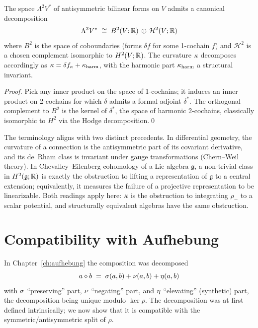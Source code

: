 \begin{theorem}\label{thm:splitting}
The space $\Lambda^2 V^*$ of antisymmetric bilinear forms on $V$ admits a
canonical decomposition
\[
\Lambda^2 V^* \;\cong\; B^2(V;\mathbb{R})\,\oplus\,\mathcal{H}^2(V;\mathbb{R})
\]
where $B^2$ is the space of coboundaries (forms $\delta f$ for some
1-cochain $f$) and $\mathcal{H}^2$ is a chosen complement isomorphic to
$H^2(V;\mathbb{R})$. The curvature $\kappa$ decomposes accordingly as
$\kappa=\delta f_\kappa+\kappa_{\mathrm{harm}}$, with the harmonic part
$\kappa_{\mathrm{harm}}$ a structural invariant.
\end{theorem}
\begin{proof}
Pick any inner product on the space of 1-cochains; it induces an inner
product on 2-cochains for which $\delta$ admits a formal adjoint
$\delta^*$. The orthogonal complement to $B^2$ is the kernel of
$\delta^*$, the space of harmonic 2-cochains, classically isomorphic to
$H^2$ via the Hodge decomposition.\qed
\end{proof}

\begin{remark}
The terminology aligns with two distinct precedents. In differential
geometry, the curvature of a connection is the antisymmetric part of its
covariant derivative, and its de~Rham class is invariant under gauge
transformations (Chern--Weil theory). In Chevalley--Eilenberg cohomology
of a Lie algebra $\mathfrak{g}$, a non-trivial class in $H^2(\mathfrak{g};\mathbb{R})$
is exactly the obstruction to lifting a representation of $\mathfrak{g}$
to a central extension; equivalently, it measures the failure of a
projective representation to be linearizable. Both readings apply here:
$\kappa$ is the obstruction to integrating $\rho_-$ to a scalar potential,
and structurally equivalent algebras have the same obstruction.
\end{remark}

\section{Compatibility with Aufhebung}\label{sec:aufhebung}

In Chapter~\ref{ch:aufhebung} the composition was decomposed
\[
a\mathbin{\diamond} b \;=\; \sigma(a,b)+\nu(a,b)+\eta(a,b)
\]
with $\sigma$ ``preserving'' part, $\nu$ ``negating'' part, and
$\eta$ ``elevating'' (synthetic) part, the decomposition being unique
modulo $\ker\rho$. The decomposition was at first defined intrinsically;
we now show that it is compatible with the symmetric/antisymmetric split
of $\rho$.

